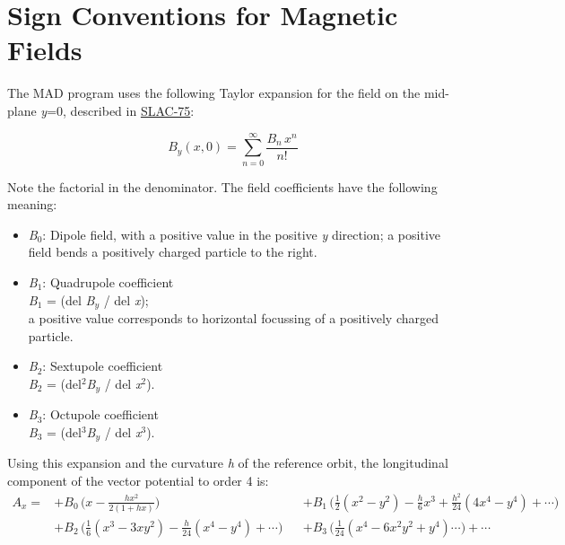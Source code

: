 
\section{Sign Conventions for Magnetic Fields}

The MAD program uses the following Taylor expansion for the field on the
mid-plane \textit{y}=0, described in
\href{bibliography.html#slac75}{SLAC-75}:  


$$
B_y(x,0)=\sum_{n=0}^{\infty} \frac{B_n\,x^n}{n!}
$$

Note the factorial in the denominator. The field coefficients have the following meaning: 
\begin{itemize}
   \item \textit{B}$_0$: Dipole field, with a positive value in the
     positive \textit{y} direction; a positive field bends a positively
     charged particle to the right.  
   \item \textit{B}$_1$: Quadrupole coefficient \\
     \textit{B}$_1$ = (del \textit{B$_y$} / del \textit{x});\\ 
     a positive value corresponds to horizontal focussing of a
     positively charged particle. 
   \item \textit{B}$_2$: Sextupole coefficient \\
     \textit{B}$_2$ =  (del$^2$\textit{B$_y$} / del \textit{x}$^2$). 
   \item \textit{B}$_3$: Octupole coefficient \\ 
     \textit{B}$_3$ =  (del$^3$\textit{B$_y$} / del \textit{x}$^3$). 
\end{itemize} 

Using this expansion and the curvature \textit{h} of the reference orbit, the longitudinal component of the vector potential to order 4 is: 
\[
\begin{aligned}
A_x =
&+ B_0\,\Big(x-\frac{hx^2}{2(1+hx)}\Big)&
&+ B_1\,\Big(\frac{1}{2}(x^2-y^2) - \frac{h}{6}x^3 + \frac{h^2}{24}(4x^4-y^4)+\cdots\Big) \\
&+ B_2\,\Big(\frac{1}{6}(x^3-3xy^2) - \frac{h}{24}(x^4-y^4)+\cdots \Big)&
&+ B_3\,\Big(\frac{1}{24}(x^4-6x^2y^2+y^4) \cdots \Big)+\cdots
\end{aligned}
\]

